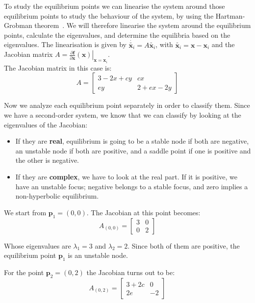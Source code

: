 To study the equilibrium points we can linearise the system around those equilibrium points to study the behaviour of the system, by using the Hartman-Grobman theorem~\cite[p. 288]{Sastry:1999:Nonlinear-systems:-analysis-stability-and-control:xr}. We will therefore linearise the system around the equilibrium points, calculate the eigenvalues, and determine the equilibria based on the eigenvalues. The linearisation is given by  $\dot{\tilde{\textbf{x}_i}} = A \tilde{\textbf{x}_i}$, with $\tilde{\textbf{x}_i} = \textbf{x} - \textbf{x}_i$ and the Jacobian matrix $A = \left. \frac{\partial\textbf{f}}{\partial \textbf{x}}(\textbf{x}) \right|_{\textbf{x}=\textbf{x}_i}$. \\The Jacobian matrix in this case is:
$$
 A=
    \left[\begin{array}{cc}
    3-2x+cy  & cx\\
    ey & 2+ex-2y
    \end{array}\right]
    $$
    
Now we analyze each equilibrium point separately in order to classify them. Since we have a second-order system, we know that we can classify by looking at the eigenvalues of the Jacobian: ~\cite[p. 37]{Khalil:2002:Nonlinear-systems:vh}

\begin{itemize}
\item If they are \textbf{real}, equilibrium is going to be a stable node if both are negative, an unstable node if both are positive, and a saddle point if one is positive and the other is negative.

\item If they are \textbf{complex}, we have to look at the real part. If it is positive, we have an unstable focus; negative belongs to a stable focus, and zero implies a non-hyperbolic equilibrium.
\end{itemize}

We start from $\mathbf{p}_1 = (0,0)$. The Jacobian at this point becomes:    
$$
 A_{(0,0)}=
    \left[\begin{array}{cc}
    3  & 0\\
    0 & 2
    \end{array}\right]
$$

Whose eigenvalues are $\lambda_1 = 3$ and $\lambda_2 = 2$. Since both of them are positive, the equilibrium point $\mathbf{p}_1$ is an unstable node.

For the point $\mathbf{p}_2 = (0,2)$ the Jacobian turns out to be:
$$
 A_{(0,2)}=
    \left[\begin{array}{cc}
    3 +2c  & 0\\
    2e & -2
    \end{array}\right]
$$

